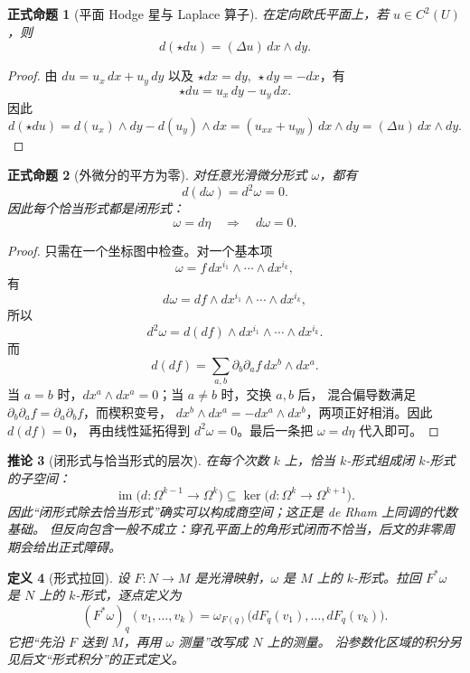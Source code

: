 \documentclass[UTF8,fontset=none,a4paper,11pt]{ctexart}
\theoremstyle{foundation-definition}
\newtheorem{definition}{定义}[section]
\theoremstyle{foundation-theorem}
\theoremstyle{foundation-proposition}
\newtheorem{proposition}[definition]{正式命题}
\theoremstyle{foundation-example}
\theoremstyle{foundation-remark}
\theoremstyle{foundation-theorem}
\newtheorem{corollary}[definition]{推论}
\begin{document}
\begin{proposition}[平面 Hodge 星与 Laplace 算子]\label{prop:hodge-laplace}
在定向欧氏平面上，若 \(u\in C^2(U)\)，则
\[
d(\star du)=(\Delta u)\,dx\wedge dy.
\]
\end{proposition}

\begin{proof}
由 \(du=u_x\,dx+u_y\,dy\) 以及
\(\star dx=dy,\ \star dy=-dx\)，有
\[
\star du=u_x\,dy-u_y\,dx.
\]
因此
\[
d(\star du)
=d(u_x)\wedge dy-d(u_y)\wedge dx
=(u_{xx}+u_{yy})\,dx\wedge dy
=(\Delta u)\,dx\wedge dy.
\]
\end{proof}

\begin{proposition}[外微分的平方为零]\label{prop:exterior-d-square}
对任意光滑微分形式 \(\omega\)，都有
\[
d(d\omega)=d^2\omega=0.
\]
因此每个恰当形式都是闭形式：
\[
\omega=d\eta\quad\Longrightarrow\quad d\omega=0.
\]
\end{proposition}

\begin{proof}
只需在一个坐标图中检查。对一个基本项
\[
\omega=f\,dx^{i_1}\wedge\cdots\wedge dx^{i_k},
\]
有
\[
d\omega=df\wedge dx^{i_1}\wedge\cdots\wedge dx^{i_k},
\]
所以
\[
d^2\omega=d(df)\wedge dx^{i_1}\wedge\cdots\wedge dx^{i_k}.
\]
而
\[
d(df)=\sum_{a,b}\partial_b\partial_a f\,dx^b\wedge dx^a.
\]
当 \(a=b\) 时，\(dx^a\wedge dx^a=0\)；当 \(a\ne b\) 时，交换 \(a,b\) 后，
混合偏导数满足 \(\partial_b\partial_a f=\partial_a\partial_b f\)，而楔积变号，
\(dx^b\wedge dx^a=-dx^a\wedge dx^b\)，两项正好相消。因此 \(d(df)=0\)，
再由线性延拓得到 \(d^2\omega=0\)。最后一条把 \(\omega=d\eta\) 代入即可。
\end{proof}

\begin{corollary}[闭形式与恰当形式的层次]
在每个次数 \(k\) 上，恰当 \(k\)-形式组成闭 \(k\)-形式的子空间：
\[
\operatorname{im}\bigl(d:\Omega^{k-1}\to\Omega^k\bigr)
\subseteq
\ker\bigl(d:\Omega^k\to\Omega^{k+1}\bigr).
\]
因此“闭形式除去恰当形式”确实可以构成商空间；这正是 de Rham 上同调的代数基础。
但反向包含一般不成立：穿孔平面上的角形式闭而不恰当，后文的非零周期会给出正式障碍。
\end{corollary}

\begin{definition}[形式拉回]\label{def:form-pullback}
设 \(F:N\to M\) 是光滑映射，\(\omega\) 是 \(M\) 上的 \(k\)-形式。拉回
\(F^*\omega\) 是 \(N\) 上的 \(k\)-形式，逐点定义为
\[
(F^*\omega)_q(v_1,\ldots,v_k)
=\omega_{F(q)}\bigl(dF_q(v_1),\ldots,dF_q(v_k)\bigr).
\]
它把“先沿 \(F\) 送到 \(M\)，再用 \(\omega\) 测量”改写成 \(N\) 上的测量。
沿参数化区域的积分另见后文“形式积分”的正式定义。
\end{definition}
\end{document}
